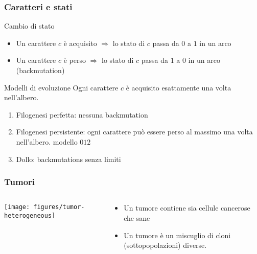 






\begin{frame}
\frametitle{Caratteri e stati}

\begin{block}{Cambio di stato}
  \begin{itemize} 
\item  Un carattere $c$ è  \alert{acquisito} $\Rightarrow$ lo stato di  $c$ passa da  $0$ a $1$
  in un arco
  \item  Un carattere $c$ è \alert{perso} $\Rightarrow$   lo stato di  $c$ passa da  $1$ a $0$
  in un arco (\alert{backmutation})
\end{itemize}
\end{block}

\begin{block}{Modelli di evoluzione}
Ogni carattere $c$ è  acquisito \alert{esattamente una volta} nell'albero.
\begin{enumerate}
\item
  Filogenesi perfetta: nessuna backmutation
\item
  Filogenesi persistente: ogni carattere può essere perso al massimo una volta nell'albero.
\alert{modello $012$}
\item
  \alert{Dollo}:
  backmutations senza limiti
\end{enumerate}
\end{block}
\end{frame}



\begin{frame}
\frametitle{Tumori}
\begin{columns}
\begin{column}{0.75\textwidth}
\centering
\texttt{[image: figures/tumor-heterogeneous]}
\end{column}
\begin{column}{0.25\textwidth}
\begin{itemize}
\item
Un \alert{tumore} contiene sia cellule cancerose che sane
\item
Un \alert{tumore} è un miscuglio di cloni (sottopopolazioni) diverse.
\end{itemize}
\end{column}
\end{columns}
\end{frame}


